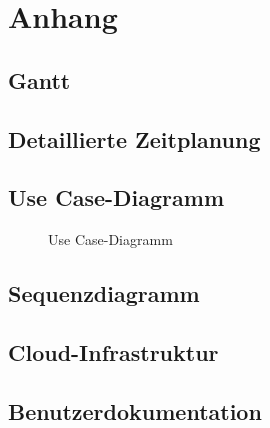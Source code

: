 \section{Anhang}
\label{sec:Anhang}
\subsection{Gantt}
\label{app:Gantt}
\clearpage

\subsection{Detaillierte Zeitplanung}
\label{app:Zeitplanung}
\clearpage

\subsection{Use Case-Diagramm}
\label{app:UseCase}
\begin{figure}[htb]
\centering
% 
\caption{Use Case-Diagramm}
\end{figure}
\clearpage

\subsection{Sequenzdiagramm}
\label{app:Sequenzdiagramm}

\subsection{Cloud-Infrastruktur}
\label{app:Cloud-Infrastruktur}
\clearpage

\subsection{Benutzerdokumentation}
\label{app:Benutzerdokumentation}
\clearpage